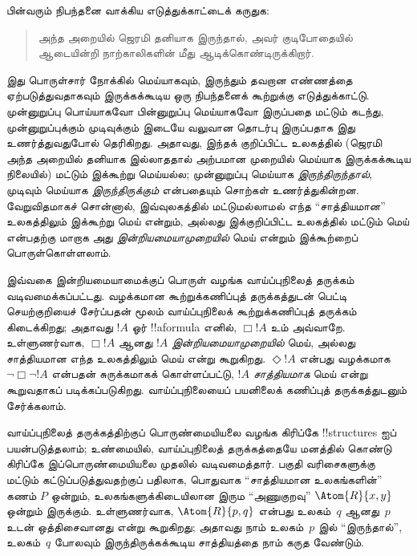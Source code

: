 \documentclass[../../../include/open-logic-section]{subfiles}
\begin{document}



பின்வரும் நிபந்தனை வாக்கிய எடுத்துக்காட்டைக் கருதுக:
\begin{quote}
  அந்த அறையில் ஜெரமி தனியாக இருந்தால், அவர் குடிபோதையில் ஆடையின்றி
  நாற்காலிகளின் மீது ஆடிக்கொண்டிருக்கிறார்.
\end{quote}
இது பொருள்சார் நோக்கில் மெய்யாகவும், இருந்தும் தவறான எண்ணத்தை
ஏற்படுத்துவதாகவும் இருக்கக்கூடிய ஒரு நிபந்தனைக் கூற்றுக்கு எடுத்துக்காட்டு.
முன்னுறுப்பு பொய்யாகவோ பின்னுறுப்பு மெய்யாகவோ இருப்பதை மட்டும் கடந்து,
முன்னுறுப்புக்கும் முடிவுக்கும் இடையே வலுவான தொடர்பு இருப்பதாக இது
உணர்த்துவதுபோல் தெரிகிறது. அதாவது, இந்தக் குறிப்பிட்ட உலகத்தில்
(ஜெரமி அந்த அறையில் தனியாக இல்லாததால் அற்பமான முறையில் மெய்யாக
இருக்கக்கூடிய நிலையில்) மட்டும் இக்கூற்று மெய்யல்ல; முன்னுறுப்பு
மெய்யாக \emph{இருந்திருந்தால்}, முடிவும் மெய்யாக
\emph{இருந்திருக்கும்} என்பதையும் சொற்கள் உணர்த்துகின்றன. வேறுவிதமாகச்
சொன்னால், இவ்வுலகத்தில் மட்டுமல்லாமல் எந்த ``சாத்தியமான'' உலகத்திலும்
இக்கூற்று மெய் என்றும், அல்லது இக்குறிப்பிட்ட உலகத்தில் மட்டும் மெய்
என்பதற்கு மாறாக அது \emph{இன்றியமையாமுறையில்} மெய் என்றும் இக்கூற்றைப்
பொருள்கொள்ளலாம்.

இவ்வகை இன்றியமையாமைக்குப் பொருள் வழங்க வாய்ப்புநிலைத் தருக்கம்
வடிவமைக்கப்பட்டது. வழக்கமான கூற்றுக்கணிப்புத் தருக்கத்துடன் பெட்டி
செயற்குறியைச் சேர்ப்பதன் மூலம் வாய்ப்புநிலைக் கூற்றுக்கணிப்புத் தருக்கம்
கிடைக்கிறது; அதாவது $!A$ ஓர் !!a{formula} எனில், $\Box !A$ உம்
அவ்வாறே. உள்ளுணர்வாக, $\Box !A$ ஆனது $!A$
\emph{இன்றியமையாமுறையில்} மெய், அல்லது சாத்தியமான எந்த உலகத்திலும்
மெய் என்று கூறுகிறது. $\Diamond !A$ என்பது வழக்கமாக
$\lnot \Box \lnot !A$ என்பதன் சுருக்கமாகக் கொள்ளப்பட்டு, $!A$
\emph{சாத்தியமாக} மெய் என்று கூறுவதாகப் படிக்கப்படுகிறது. வாய்ப்புநிலையைப்
பயனிலைக் கணிப்புத் தருக்கத்துடனும் சேர்க்கலாம்.

வாய்ப்புநிலைத் தருக்கத்திற்குப் பொருண்மையியலை வழங்க கிரிப்கே
!!{structure}s ஐப் பயன்படுத்தலாம்; உண்மையில், வாய்ப்புநிலைத்
தருக்கத்தையே மனத்தில் கொண்டு கிரிப்கே இப்பொருண்மையியலை முதலில்
வடிவமைத்தார். பகுதி வரிசைகளுக்கு மட்டும் கட்டுப்படுத்துவதற்குப் பதிலாக,
பொதுவாக ``சாத்தியமான உலகங்களின்'' கணம் $P$ ஒன்றும், உலகங்களுக்கிடையிலான
இரும ``அணுகுறவு'' $\Atom{R}{x,y}$ ஒன்றும் இருக்கும். உள்ளுணர்வாக,
$\Atom{R}{p,q}$ என்பது உலகம்~$q$ ஆனது~$p$ உடன் ஒத்திசைவானது என்று
கூறுகிறது; அதாவது நாம் உலகம்~$p$ இல் ``இருந்தால்'', உலகம்~$q$ போலவும்
இருந்திருக்கக்கூடிய சாத்தியத்தை நாம் கருத வேண்டும்.
\end{document}
